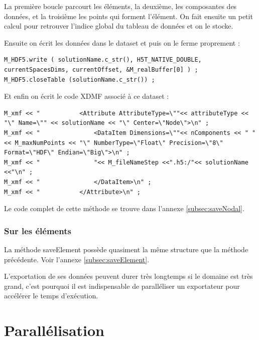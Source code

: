 \documentclass[12pt]{article}
\begin{document}
La première boucle parcourt les éléments, la deuxième, les composantes des données, et la troisième les points qui forment l'élément. On fait ensuite un petit calcul pour retrouver l'indice global du tableau de données et on le stocke.\newline

Ensuite on écrit les données dans le dataset et puis on le ferme proprement :
\begin{lstlisting}
M_HDF5.write ( solutionName.c_str(), H5T_NATIVE_DOUBLE, currentSpacesDims, currentOffset, &M_realBuffer[0] ) ;
M_HDF5.closeTable (solutionName.c_str()) ; 
\end{lstlisting}
Et enfin on écrit le code XDMF associé à ce dataset :
\begin{lstlisting}
M_xmf << "           <Attribute AttributeType=\""<< attributeType << "\" Name=\"" << solutionName << "\" Center=\"Node\">\n" ;
M_xmf << "               <DataItem Dimensions=\""<< nComponents << " " << M_maxNumPoints << "\" NumberType=\"Float\" Precision=\"8\" Format=\"HDF\" Endian=\"Big\">\n" ;
M_xmf << "               "<< M_fileNameStep <<".h5:/"<< solutionName <<"\n" ;
M_xmf << "               </DataItem>\n" ;    
M_xmf << "           </Attribute>\n" ;
\end{lstlisting}
Le code complet de cette méthode se trouve dans l'annexe \ref{subsec:saveNodal}.
\subsubsection{Sur les éléments}
\label{subsubsec:exportationsaveElement}
La méthode saveElement possède quasiment la même structure que la méthode précédente. \newline
Voir l'annexe \ref{subsec:saveElement}.\newline

L'exportation de ses données peuvent durer très longtemps si le domaine est très grand, c'est pourquoi il est indispensable de paralléliser un exportateur pour accélérer le temps d'exécution.
\newpage
\section {Parallélisation}
\end{document}

